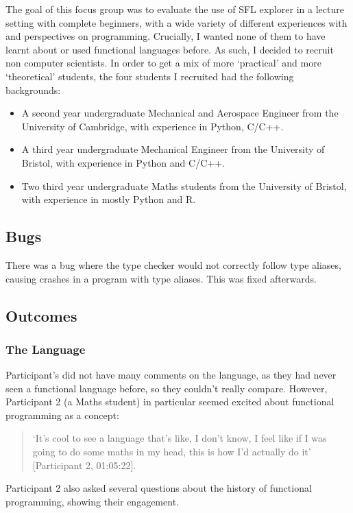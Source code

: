 The goal of this focus group was to evaluate the use of SFL explorer in a lecture setting with complete beginners, with a wide variety of different experiences with and perspectives on programming. Crucially, I wanted none of them to have learnt about or used functional languages before. As such, I decided to recruit non computer scientists. In order to get a mix of more `practical' and more `theoretical' students, the four students I recruited had the following backgrounds:

\begin{itemize}
    \item A second year undergraduate Mechanical and Aerospace Engineer from the University of Cambridge, with experience in Python, C/C++.
    \item A third year undergraduate Mechanical Engineer from the University of Bristol, with experience in Python and C/C++.
    \item Two third year undergraduate Maths students from the University of Bristol, with experience in mostly Python and R.
\end{itemize}

\subsection{Bugs}
There was a bug where the type checker would not correctly follow type aliases, causing crashes in a program with type aliases. This was fixed afterwards. 

\subsection{Outcomes}

\subsubsection{The Language}
Participant's did not have many comments on the language, as they had never seen a functional language before, so they couldn't really compare. However, Participant 2 (a Maths student) in particular seemed excited about functional programming as a concept:
\begin{quotation}
\noindent `It's cool to see a language that's like, I don't know, I feel like if I was going to do some maths in my head, this is how I'd actually do it' [Participant 2, 01:05:22]. 
\end{quotation}
\noindent Participant 2 also asked several questions about the history of functional programming, showing their engagement. 

